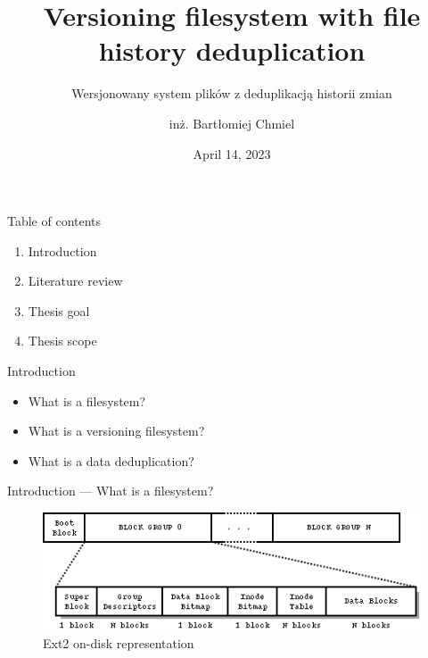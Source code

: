 \documentclass[xcolor=table]{beamer}
\title{Versioning filesystem with file history deduplication}
\subtitle{Wersjonowany system plików z deduplikacją historii zmian}
\author[author1]{inż. Bartłomiej Chmiel}
\institute{Faculty of Information and Communication Technology}
\date{April 14, 2023}
\begin{document}
	\frame{\titlepage}

	\begin{frame}{Table of contents}
		\begin{enumerate}
			\item Introduction
			\item Literature review
			\item Thesis goal
			\item Thesis scope
		\end{enumerate}
	\end{frame}

	\begin{frame}{Introduction}
		\begin{itemize}
			\item What is a filesystem?
			\item What is a versioning filesystem?
			\item What is a data deduplication?
		\end{itemize}
	\end{frame}

	\begin{frame}{Introduction --- What is a filesystem?}
		\begin{figure}
			\centering
			\includegraphics[width=\textwidth]{media/Ext2.png}
			\caption{Ext2 on-disk representation }
		\end{figure}
	\end{frame}
\end{document}
